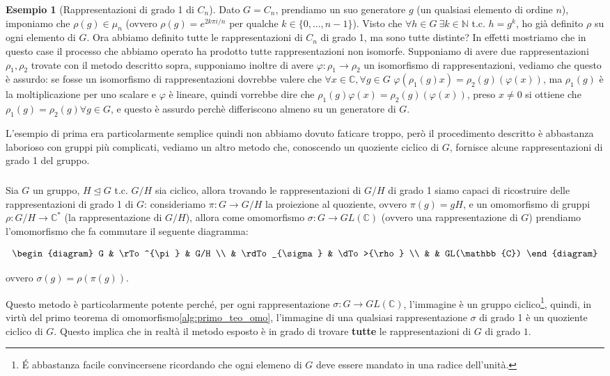 \documentclass[11pt]{article}
\theoremstyle{plain}
\theoremstyle{definition}
\newtheorem{exmp}{Esempio}[section]
\theoremstyle{remark}
\newcommand{\C}{\mathbb{C}}
\newcommand{\N}{\mathbb{N}}
\newcommand{\tridiag}[6]{
	\[
	  \begin{diagram}
	  #1 & \rTo^{#2}  & #3        \\
	     & \rdTo_{#6} & \dTo>{#4}   \\
	     &          & #5
	  \end{diagram}
	\]
}
\begin{document}
\begin{exmp}[Rappresentazioni di grado 1 di $C_n$]
Dato $G=C_n$, prendiamo un suo generatore $g$ (un qualsiasi elemento di ordine $n$), imponiamo che $\rho(g)\in \mu_n$ (ovvero $\rho(g)=e^{2k\pi i/n}$ per qualche $k\in \{0,\ldots,n-1\}$). Visto che $\forall h\in G\ \exists k\in \N$ t.c. $h=g^k$, ho già definito $\rho$ su ogni elemento di $G$.\newline
Ora abbiamo definito tutte le rappresentazioni di $C_n$ di grado 1, ma sono tutte distinte? In effetti mostriamo che in questo case il processo che abbiamo operato ha prodotto tutte rappresentazioni non isomorfe. Supponiamo di avere due rappresentazioni $\rho_1, \rho_2$ trovate con il metodo descritto sopra, supponiamo inoltre di avere $\varphi:\rho_1\to\rho_2$ un isomorfismo di rappresentazioni, vediamo che questo è assurdo: se fosse un isomorfismo di rappresentazioni dovrebbe valere che $\forall x\in \C, \forall g\in G$ $\varphi( \rho_1(g)x ) = \rho_2(g)( \varphi(x) )$, ma $\rho_1(g)$ è la moltiplicazione per uno scalare e $\varphi$ è lineare, quindi vorrebbe dire che $\rho_1(g)\varphi( x ) = \rho_2(g)( \varphi(x) )$, preso $x\neq 0$ si ottiene che $\rho_1(g)=\rho_2(g)\forall g\in G$, e questo è assurdo perchè differiscono almeno su un generatore di $G$.
\end{exmp}

L'esempio di prima era particolarmente semplice quindi non abbiamo dovuto faticare troppo, però il procedimento descritto è abbastanza laborioso con gruppi più complicati, vediamo un altro metodo che, conoscendo un quoziente ciclico di $G$, fornisce alcune rappresentazioni di grado 1 del gruppo.
\subparagraph{}
Sia $G$ un gruppo, $H\trianglelefteq G$ t.c. $G/H$ sia ciclico, allora trovando le rappresentazioni di $G/H$ di grado 1 siamo capaci di ricostruire delle rappresentazioni di grado 1 di $G$: consideriamo $\pi:G\to G/H$ la proiezione al quoziente, ovvero $\pi(g)=gH$, e un omomorfismo di gruppi $\rho:G/H\to \C^*$ (la rappresentazione di $G/H$), allora come omomorfismo $\sigma:G\to GL(\C)$ (ovvero una rappresentazione di $G$) prendiamo l'omomorfismo che fa commutare il seguente diagramma:
\tridiag G \pi {G/H} \rho {GL(\C)} \sigma
ovvero $\sigma(g)=\rho(\pi(g))$.

Questo metodo è particolarmente potente perché, per ogni rappresentazione $\sigma:G\to GL(\C)$, l'immagine è un gruppo ciclico\footnote{\'E abbastanza facile convincersene ricordando che ogni elemeno di $G$ deve essere mandato in una radice dell'unità.}, quindi, in virtù del primo teorema di omomorfismo\eqref{alg:primo_teo_omo}, l'immagine di una qualsiasi rappresentazione $\sigma$ di grado 1 è un quoziente ciclico di $G$.
Questo implica che in realtà il metodo esposto è in grado di trovare \textbf{tutte} le rappresentazioni di $G$ di grado $1$.
\end{document}

